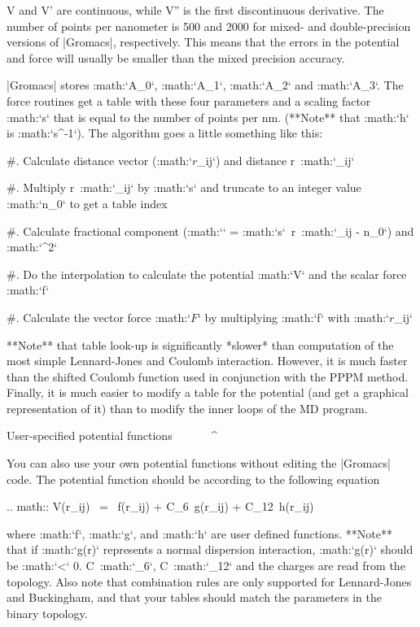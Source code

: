 V and V’ are continuous, while V” is the first discontinuous
derivative. The number of points per nanometer is 500 and 2000 for
mixed- and double-precision versions of |Gromacs|, respectively. This
means that the errors in the potential and force will usually be smaller
than the mixed precision accuracy.

|Gromacs| stores :math:`A_0`, :math:`A_1`, :math:`A_2` and :math:`A_3`.
The force routines get a table with these four parameters and a scaling
factor :math:`s` that is equal to the number of points per nm. (**Note**
that :math:`h` is :math:`s^{-1}`). The algorithm goes a little something
like this:

#. Calculate distance vector
   (:math:`{\mbox{\boldmath ${r}$}}_{ij}`) and distance
   r\ :math:`_{ij}`

#. Multiply r\ :math:`_{ij}` by :math:`s` and truncate to an integer
   value :math:`n_0` to get a table index

#. Calculate fractional component (:math:`\epsilon` =
   :math:`s`\ r\ :math:`_{ij} - n_0`) and :math:`\epsilon^2`

#. Do the interpolation to calculate the potential :math:`V` and the
   scalar force :math:`f`

#. Calculate the vector force :math:`{\mbox{\boldmath ${F}$}}` by
   multiplying :math:`f` with
   :math:`{\mbox{\boldmath ${r}$}}_{ij}`

**Note** that table look-up is significantly *slower* than computation
of the most simple Lennard-Jones and Coulomb interaction. However, it is
much faster than the shifted Coulomb function used in conjunction with
the PPPM method. Finally, it is much easier to modify a table for the
potential (and get a graphical representation of it) than to modify the
inner loops of the MD program.

User-specified potential functions
^^^^^^^^^^^^^^^^^^^^^^^^^^^^^^^^^^

You can also use your own potential functions without editing the
|Gromacs| code. The potential function should be according to the
following equation

.. math:: V(r_{ij}) ~=~  f(r_{ij}) + C_6 \,g(r_{ij}) + C_{12} \,h(r_{ij})

where :math:`f`, :math:`g`, and :math:`h` are user defined functions.
**Note** that if :math:`g(r)` represents a normal dispersion
interaction, :math:`g(r)` should be :math:`<` 0. C\ :math:`_6`,
C\ :math:`_{12}` and the charges are read from the topology. Also note
that combination rules are only supported for Lennard-Jones and
Buckingham, and that your tables should match the parameters in the
binary topology.

